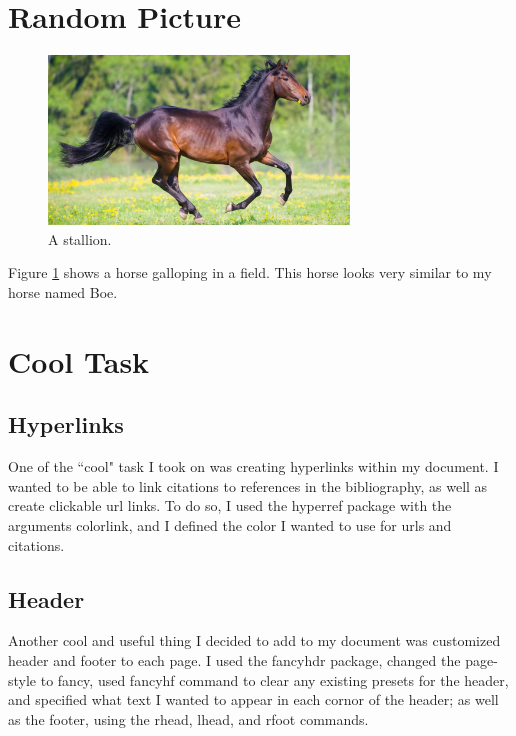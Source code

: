 \documentclass[12pt, letterpaper]{article} %
\begin{document}
\section{Random Picture} %
\begin{figure}[t] %
    \begin{center} %
        \includegraphics[width=8cm]{horse.png}  %
        \caption{A stallion.} %
        \label{fig:horse} %
    \end{center} %
\end{figure} %
Figure \ref{fig:horse} %
shows a horse galloping in a field. This horse looks very similar to my horse named Boe. 

\section{Cool Task } %
\subsection{Hyperlinks} %
One of the ``cool" task I took on was creating hyperlinks within my document. I wanted to be able to link citations to references in the bibliography, as well as create clickable url links. To do so, I used the hyperref package with the arguments colorlink, and I defined the color I wanted to use for urls and citations. 
\subsection{Header} %
Another cool and useful thing I decided to add to my document was customized header and footer to each page. I used the fancyhdr package, changed the page-style to fancy, used fancyhf command to clear any existing presets for the header, and specified what text I wanted to appear in each cornor of the header; as well as the footer, using the rhead, lhead, and rfoot commands. 

\newpage %
\end{document}
